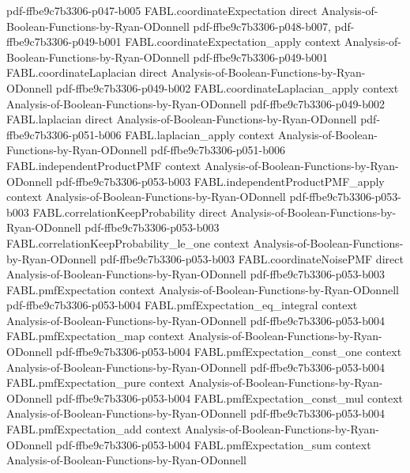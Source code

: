 \begin{theorem}
  {pdf-ffbe9c7b3306-p047-b005}
\proofstep
  {FABL.coordinateExpectation}
  {direct}
  {Analysis-of-Boolean-Functions-by-Ryan-ODonnell}
  {pdf-ffbe9c7b3306-p048-b007,
    pdf-ffbe9c7b3306-p049-b001}
\proofstep
  {FABL.coordinateExpectation_apply}
  {context}
  {Analysis-of-Boolean-Functions-by-Ryan-ODonnell}
  {pdf-ffbe9c7b3306-p049-b001}
\proofstep
  {FABL.coordinateLaplacian}
  {direct}
  {Analysis-of-Boolean-Functions-by-Ryan-ODonnell}
  {pdf-ffbe9c7b3306-p049-b002}
\proofstep
  {FABL.coordinateLaplacian_apply}
  {context}
  {Analysis-of-Boolean-Functions-by-Ryan-ODonnell}
  {pdf-ffbe9c7b3306-p049-b002}
\proofstep
  {FABL.laplacian}
  {direct}
  {Analysis-of-Boolean-Functions-by-Ryan-ODonnell}
  {pdf-ffbe9c7b3306-p051-b006}
\proofstep
  {FABL.laplacian_apply}
  {context}
  {Analysis-of-Boolean-Functions-by-Ryan-ODonnell}
  {pdf-ffbe9c7b3306-p051-b006}
\proofstep
  {FABL.independentProductPMF}
  {context}
  {Analysis-of-Boolean-Functions-by-Ryan-ODonnell}
  {pdf-ffbe9c7b3306-p053-b003}
\proofstep
  {FABL.independentProductPMF_apply}
  {context}
  {Analysis-of-Boolean-Functions-by-Ryan-ODonnell}
  {pdf-ffbe9c7b3306-p053-b003}
\proofstep
  {FABL.correlationKeepProbability}
  {direct}
  {Analysis-of-Boolean-Functions-by-Ryan-ODonnell}
  {pdf-ffbe9c7b3306-p053-b003}
\proofstep
  {FABL.correlationKeepProbability_le_one}
  {context}
  {Analysis-of-Boolean-Functions-by-Ryan-ODonnell}
  {pdf-ffbe9c7b3306-p053-b003}
\proofstep
  {FABL.coordinateNoisePMF}
  {direct}
  {Analysis-of-Boolean-Functions-by-Ryan-ODonnell}
  {pdf-ffbe9c7b3306-p053-b003}
\proofstep
  {FABL.pmfExpectation}
  {context}
  {Analysis-of-Boolean-Functions-by-Ryan-ODonnell}
  {pdf-ffbe9c7b3306-p053-b004}
\proofstep
  {FABL.pmfExpectation_eq_integral}
  {context}
  {Analysis-of-Boolean-Functions-by-Ryan-ODonnell}
  {pdf-ffbe9c7b3306-p053-b004}
\proofstep
  {FABL.pmfExpectation_map}
  {context}
  {Analysis-of-Boolean-Functions-by-Ryan-ODonnell}
  {pdf-ffbe9c7b3306-p053-b004}
\proofstep
  {FABL.pmfExpectation_const_one}
  {context}
  {Analysis-of-Boolean-Functions-by-Ryan-ODonnell}
  {pdf-ffbe9c7b3306-p053-b004}
\proofstep
  {FABL.pmfExpectation_pure}
  {context}
  {Analysis-of-Boolean-Functions-by-Ryan-ODonnell}
  {pdf-ffbe9c7b3306-p053-b004}
\proofstep
  {FABL.pmfExpectation_const_mul}
  {context}
  {Analysis-of-Boolean-Functions-by-Ryan-ODonnell}
  {pdf-ffbe9c7b3306-p053-b004}
\proofstep
  {FABL.pmfExpectation_add}
  {context}
  {Analysis-of-Boolean-Functions-by-Ryan-ODonnell}
  {pdf-ffbe9c7b3306-p053-b004}
\proofstep
  {FABL.pmfExpectation_sum}
  {context}
  {Analysis-of-Boolean-Functions-by-Ryan-ODonnell}

\end{theorem}
